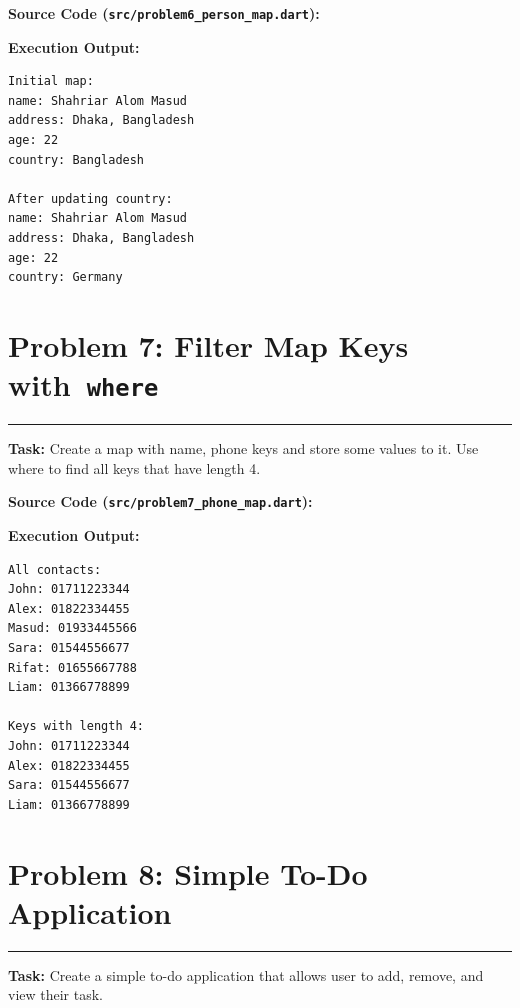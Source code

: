 \documentclass[11pt,a4paper]{article}
\begin{document}
\vspace{0.1cm}
\textbf{Source Code (\texttt{src/problem6\_person\_map.dart}):}


\textbf{Execution Output:}
\begin{lstlisting}[style=outputstyle]
Initial map:
name: Shahriar Alom Masud
address: Dhaka, Bangladesh
age: 22
country: Bangladesh

After updating country:
name: Shahriar Alom Masud
address: Dhaka, Bangladesh
age: 22
country: Germany
\end{lstlisting}

\newpage

\section*{Problem 7: Filter Map Keys with~\texttt{where}}
\noindent\rule{\textwidth}{0.4pt}\vspace{0.08cm}
\textbf{Task:} Create a map with name, phone keys and store some values to it. Use where to find all keys that have length 4.

\vspace{0.1cm}
\textbf{Source Code (\texttt{src/problem7\_phone\_map.dart}):}


\textbf{Execution Output:}
\begin{lstlisting}[style=outputstyle]
All contacts:
John: 01711223344
Alex: 01822334455
Masud: 01933445566
Sara: 01544556677
Rifat: 01655667788
Liam: 01366778899

Keys with length 4:
John: 01711223344
Alex: 01822334455
Sara: 01544556677
Liam: 01366778899
\end{lstlisting}

\newpage

\section*{Problem 8: Simple To-Do Application}
\noindent\rule{\textwidth}{0.4pt}\vspace{0.08cm}
\textbf{Task:} Create a simple to-do application that allows user to add, remove, and view their task.
\end{document}
